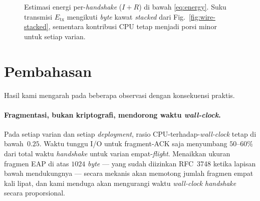 \documentclass{easychair}
\begin{document}
\begin{figure}[H]
\centering
{}
\caption{Estimasi energi per-\emph{handshake} ($I\!+\!R$) di bawah
\eqref{eq:energy}. Suku transmisi $E_{\mathrm{tx}}$ mengikuti
\emph{byte} kawat \emph{stacked} dari Fig.~\ref{fig:wire-stacked},
sementara kontribusi CPU tetap menjadi porsi minor untuk setiap
varian.}
\label{fig:energy-stacked}
\end{figure}
\FloatBarrier


\section{Pembahasan}
\label{discussion}
Hasil kami mengarah pada beberapa observasi dengan konsekuensi
praktis.

\paragraph{Fragmentasi, bukan kriptografi, mendorong waktu \emph{wall-clock}.}
Pada setiap varian dan setiap \emph{deployment}, rasio
CPU-terhadap-\emph{wall-clock} tetap di bawah~$0.25$. Waktu tunggu
I/O untuk fragment-ACK saja menyumbang $50$--$60\%$ dari total waktu
\emph{handshake} untuk varian empat-\emph{flight}. Menaikkan ukuran
fragmen EAP di atas $1024$ \emph{byte} --- yang sudah diizinkan
RFC~3748 ketika lapisan bawah mendukungnya --- secara mekanis akan
memotong jumlah fragmen empat kali lipat, dan kami menduga akan
mengurangi waktu \emph{wall-clock} \emph{handshake} secara
proporsional.
\end{document}
